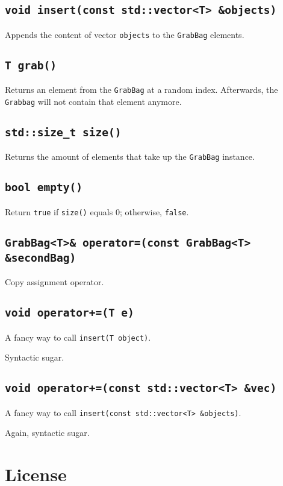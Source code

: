 \documentclass[a4paper,12pt]{article}
\begin{document}
\newpage

\subsection{\texttt{void insert(const std::vector<T> \&objects)}}

Appends the content of vector \texttt{objects} to the \texttt{GrabBag} elements.

 

\subsection{\texttt{T grab()}}

Returns an element from the \texttt{GrabBag} at a random index. 
Afterwards, the \texttt{Grabbag} will not contain that element anymore.



\newpage

\subsection{\texttt{std::size\_t size()}}

Returns the amount of elements that take up the \texttt{GrabBag} instance.

\subsection{\texttt{bool empty()}}

Return \texttt{true} if \texttt{size()} equals 0; otherwise, \texttt{false}.



\subsection{\texttt{GrabBag<T>\& operator=(const GrabBag<T> \&secondBag)}}

Copy assignment operator.



\subsection{\texttt{void operator+=(T e)}}

A fancy way to call \texttt{insert(T object)}.

Syntactic sugar.

\subsection{\texttt{void operator+=(const std::vector<T> \&vec)}}

A fancy way to call \texttt{insert(const std::vector<T> \&objects)}.

Again, syntactic sugar.

\newpage
\section{License}
\end{document}
